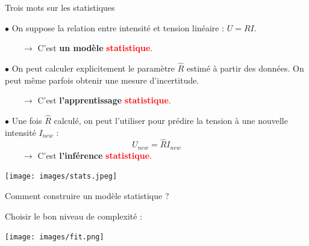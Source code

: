 \documentclass{beamer}
\begin{document}
\begin{frame}{Trois mots sur les statistiques}

$\bullet$ On suppose la relation entre intensité et tension linéaire : $U = R I$.

$\hspace{2em} \rightarrow$ C'est \textbf{un modèle} \textcolor{red}{\textbf{statistique}}.

\vspace{2em}

$\bullet$ On peut calculer explicitement le paramètre $\hat R$ estimé à partir des données. On peut même parfois obtenir une mesure d'incertitude.

$\hspace{2em} \rightarrow$ C'est \textbf{l'apprentissage} \textcolor{red}{\textbf{statistique}}.

\vspace{2em}

$\bullet$ Une fois $\hat R$ calculé, on peut l'utiliser pour prédire la tension à une nouvelle intensité $I_{new}$ : $$U_{new} = \hat R I_{new} $$
$\hspace{2em} \rightarrow$ C'est \textbf{l'inférence} \textcolor{red}{\textbf{statistique}}. 

\end{frame}

\begin{frame}[plain]
\begin{center}
\texttt{[image: images/stats.jpeg]}
\end{center}
\end{frame}


\begin{frame}{Comment construire un modèle statistique ?}

Choisir le bon niveau de complexité :

\texttt{[image: images/fit.png]} 

\end{frame}



\end{document}
